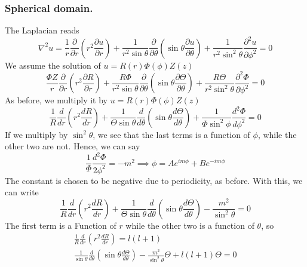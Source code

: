 \documentclass[../main.tex]{subfiles}
\begin{document}
\subsubsection*{Spherical domain.} The Laplacian reads
\begin{equation*}
    \nabla^2u=\frac{1}{r}\frac{\partial}{\partial r}\left(r^2\frac{\partial u}{\partial r}\right) +\frac{1}{r^2\sin\theta}\frac{\partial}{\partial \theta}\left(\sin\theta \frac{\partial u}{\partial \theta}\right) +\frac{1}{r^2\sin^2\theta}\frac{\partial^2u}{\partial \phi^2}=0
\end{equation*}
We assume the solution of $u = R(r)\Phi(\phi)Z(z)$
\begin{equation*}
    \frac{\Phi Z}{r}\frac{\partial}{\partial r}\left(r^2\frac{\partial R}{\partial r}\right) +\frac{R\Phi}{r^2\sin\theta}\frac{\partial}{\partial \theta}\left(\sin\theta \frac{\partial \Theta}{\partial \theta}\right) +\frac{R\Theta}{r^2\sin^2\theta}\frac{\partial^2\Phi}{\partial \phi^2}=0
\end{equation*}
As before, we multiply it by $u = R(r)\Phi(\phi)Z(z)$
\begin{equation*}
    \frac{1}{R}\frac{d}{dr}\left(r^2\frac{dR}{dr}\right) +\frac{1}{\Theta\sin\theta}\frac{d}{d\theta}\left(\sin\theta\frac{d\Theta}{d\theta}\right) +\frac{1}{\Phi\sin^2\phi}\frac{d^2\Phi}{d\phi^2}=0
\end{equation*}
If we multiply by $\sin^2\theta$, we see that the last terms is a function of $\phi$, while the other two are not. 
Hence, we can say
\begin{equation*}
    \frac{1}{\Phi}\frac{d^2\Phi}{2\phi^2}=-m^2\implies\phi=Ae^{im\phi}+ Be^{-im\phi}
\end{equation*}
The constant is chosen to be negative due to periodicity, as before. 
With this, we can write
\begin{equation*}
    \frac{1}{R}\frac{d}{dr}\left(r^2\frac{dR}{dr}\right) +\frac{1}{\Theta\sin\theta}\frac{d}{d\theta}\left(\sin\theta\frac{d\Theta}{d\theta}\right) -\frac{m^2}{\sin^2\theta}=0
\end{equation*}
The first term is a Function of $r$ while the other two is a function of $\theta$, so
\begin{gather*}
    \frac{1}{R}\frac{d}{dr}\left(r^2\frac{dR}{dr}\right) =l(l+1)\\
    \frac{1}{\sin\theta}\frac{d}{d\theta}\left(\sin\theta\frac{d\Theta}{d\theta}\right) -\frac{m^2}{\sin^2\theta}\Theta +l(l+1)\Theta =0
\end{gather*}
\end{document}
